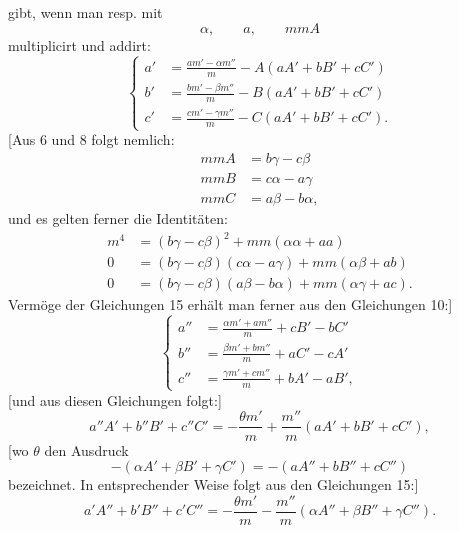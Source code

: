 %
\noindent gibt, wenn man resp. mit
\[
\alpha,\qquad a,\qquad mmA
\]
multiplicirt und addirt:
\begin{equation}\tag*{[15]}
\left\{\begin{aligned}
a'&=\frac{am'-\alpha m''}{m}-A(aA'+bB'+cC')\\
b'&=\frac{bm'-\beta m''}{m}-B(aA'+bB'+cC')\\
c'&=\frac{cm'-\gamma m''}{m}-C(aA'+bB'+cC').
\end{aligned}\right.
\end{equation}
[Aus 6 und 8 folgt nemlich:
\[
\begin{aligned}
mmA&=b\gamma-c\beta\\
mmB&=c\alpha-a\gamma\\
mmC&=a\beta-b\alpha,
\end{aligned}
\]
und es gelten ferner die Identitäten:
\[
\begin{aligned}
m^4&=(b\gamma-c\beta)^2+mm(\alpha\alpha+aa)\\
0&=(b\gamma-c\beta)(c\alpha-a\gamma)+mm(\alpha\beta+ab)\\
0&=(b\gamma-c\beta)(a\beta-b\alpha)+mm(\alpha\gamma+ac).
\end{aligned}
\]
\indent Vermöge der Gleichungen 15 erhält man ferner aus den Gleichungen 10:]
\begin{equation}\tag*{[16]}
\left\{\begin{aligned}
a''&=\frac{\alpha m'+am''}{m}+cB'-bC'\\
b''&=\frac{\beta m'+bm''}{m}+aC'-cA'\\
c''&=\frac{\gamma m'+cm''}{m}+bA'-aB',
\end{aligned}\right.
\end{equation}
[und aus diesen Gleichungen folgt:]
\begin{equation}\tag*{[17]}
a''A'+b''B'+c''C'=-\frac{\theta m'}{m}+\frac{m''}{m}(aA'+bB'+cC'),
\end{equation}
[wo $\theta$ den Ausdruck
\[
-(\alpha A'+\beta B'+\gamma C')=-(aA''+bB''+cC'')
\]
bezeichnet. In entsprechender Weise folgt aus den Gleichungen 15:]
\begin{equation}\tag*{[18]}
a'A''+b'B''+c'C''=-\frac{\theta m'}{m}-\frac{m''}{m}(\alpha A''+\beta B''+\gamma C'').
\end{equation}

